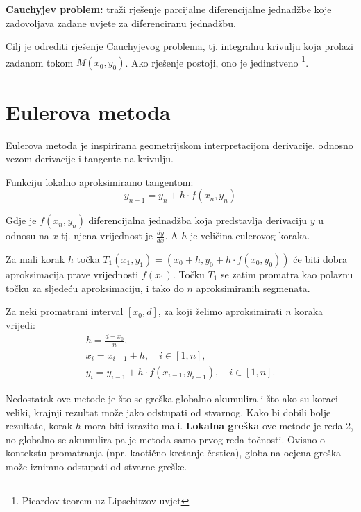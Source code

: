 \textbf{Cauchyjev problem:} traži rješenje parcijalne diferencijalne jednadžbe
koje zadovoljava zadane uvjete za diferenciranu jednadžbu.

Cilj je odrediti rješenje Cauchyjevog problema, tj. integralnu krivulju koja
prolazi zadanom tokom $M(x_0,y_0)$. Ako rješenje postoji, ono je jedinstveno
\footnote{Picardov teorem uz Lipschitzov uvjet}.

\section{Eulerova metoda}

Eulerova metoda je inspirirana geometrijskom interpretacijom derivacije, odnosno
vezom derivacije i tangente na krivulju.

Funkciju lokalno aproksimiramo tangentom:
$$
y_{n+1} = y_n + h\cdot f(x_n, y_n)
$$

Gdje je $f(x_n, y_n)$ diferencijalna jednadžba koja predstavlja derivaciju $y$ u
odnosu na $x$ tj. njena vrijednost je $\frac{dy}{dx}$. A $h$ je veličina
eulerovog koraka.

Za mali korak $h$ točka $T_1(x_1, y_1) = (x_0 + h, y_0 + h \cdot f(x_0, y_0))$
će biti dobra aproksimacija prave vrijednosti $f(x_1)$. Točku $T_1$ se zatim
promatra kao polaznu točku za sljedeću aproksimaciju, i tako do $n$
aproksimiranih segmenata.

Za neki promatrani interval $[x_0, d]$, za koji želimo aproksimirati $n$ koraka
vrijedi:
\begin{gather*}
    h=\frac{d - x_0}{n},\\
    x_i = x_{i-1} + h,\quad i \in [1, n],\\
    y_i = y_{i-1} + h\cdot f(x_{i-1}, y_{i-1}),\quad i \in [1, n].
\end{gather*}

Nedostatak ove metode je što se greška globalno akumulira i što ako su koraci
veliki, krajnji rezultat može jako odstupati od stvarnog. Kako bi dobili bolje
rezultate, korak $h$ mora biti izrazito mali.
\smallskip
\textbf{Lokalna greška} ove metode je reda 2, no globalno se akumulira pa je
metoda samo prvog reda točnosti. Ovisno o kontekstu promatranja (npr. kaotično
kretanje čestica), globalna ocjena greška može iznimno odstupati od stvarne
greške.

